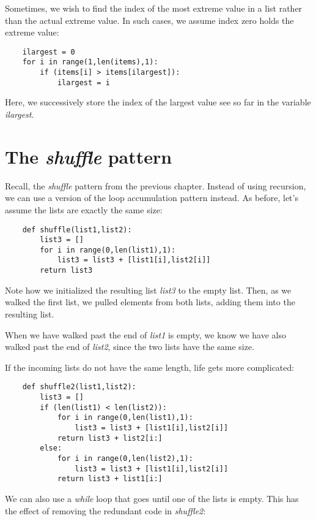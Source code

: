 Sometimes, we wish to find the index of the most extreme
value in a list rather than the actual extreme value.
In such cases, we assume index zero holds the extreme value:

\begin{verbatim}
    ilargest = 0
    for i in range(1,len(items),1):
        if (items[i] > items[ilargest]):
            ilargest = i
\end{verbatim}

Here, we successively store the index of the largest value
see so far in the variable {\it ilargest}.

\section{The {\it shuffle} pattern}

Recall, the {\it shuffle} pattern from the previous chapter.
Instead of using recursion, we can use a version of
the loop accumulation pattern instead. As before,
let's assume the lists are exactly the same size:

\begin{verbatim}
    def shuffle(list1,list2):
        list3 = []
        for i in range(0,len(list1),1):
            list3 = list3 + [list1[i],list2[i]]
        return list3
\end{verbatim}

Note how we initialized the resulting list {\it list3} to
the empty list. Then, as we walked the first list, we
pulled elements from both lists, adding them into the
resulting list.

When we have walked past the end of {\it list1} is empty,
we know we have also walked past the end of {\it list2}, since the
two lists have the same size.

If the incoming lists do not have the same length,
life gets more complicated:

\begin{verbatim}
    def shuffle2(list1,list2):
        list3 = []
        if (len(list1) < len(list2)):
            for i in range(0,len(list1),1):
                list3 = list3 + [list1[i],list2[i]]
            return list3 + list2[i:]
        else:
            for i in range(0,len(list2),1):
                list3 = list3 + [list1[i],list2[i]]
            return list3 + list1[i:]
\end{verbatim}

We can also use a {\it while} loop that goes until one of the lists
is empty. This has the effect of removing the redundant code
in {\it shuffle2}:

